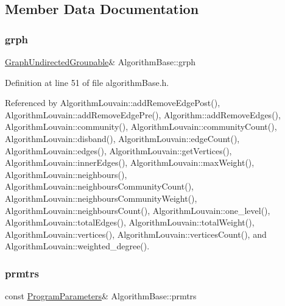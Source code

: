 \subsection{Member Data Documentation}
\mbox{\label{classAlgorithmBase_a54b71b720b025291d9802e20874c860d}} 
\subsubsection{\texorpdfstring{grph}{grph}}
{\footnotesize\ttfamily \hyperlink{classGraphUndirectedGroupable}{Graph\+Undirected\+Groupable}\& Algorithm\+Base\+::grph\hspace{0.3cm}{\ttfamily [protected]}}



Definition at line 51 of file algorithm\+Base.\+h.



Referenced by Algorithm\+Louvain\+::add\+Remove\+Edge\+Post(), Algorithm\+Louvain\+::add\+Remove\+Edge\+Pre(), Algorithm\+::add\+Remove\+Edges(), Algorithm\+Louvain\+::community(), Algorithm\+Louvain\+::community\+Count(), Algorithm\+Louvain\+::disband(), Algorithm\+Louvain\+::edge\+Count(), Algorithm\+Louvain\+::edges(), Algorithm\+Louvain\+::get\+Vertices(), Algorithm\+Louvain\+::inner\+Edges(), Algorithm\+Louvain\+::max\+Weight(), Algorithm\+Louvain\+::neighbours(), Algorithm\+Louvain\+::neighbours\+Community\+Count(), Algorithm\+Louvain\+::neighbours\+Community\+Weight(), Algorithm\+Louvain\+::neighbours\+Count(), Algorithm\+Louvain\+::one\+\_\+level(), Algorithm\+Louvain\+::total\+Edges(), Algorithm\+Louvain\+::total\+Weight(), Algorithm\+Louvain\+::vertices(), Algorithm\+Louvain\+::vertices\+Count(), and Algorithm\+Louvain\+::weighted\+\_\+degree().

\mbox{\label{classAlgorithmBase_a69765034d365e4cab46c25ec626db528}} 
\subsubsection{\texorpdfstring{prmtrs}{prmtrs}}
{\footnotesize\ttfamily const \hyperlink{structProgramParameters}{Program\+Parameters}\& Algorithm\+Base\+::prmtrs\hspace{0.3cm}{\ttfamily [protected]}}



